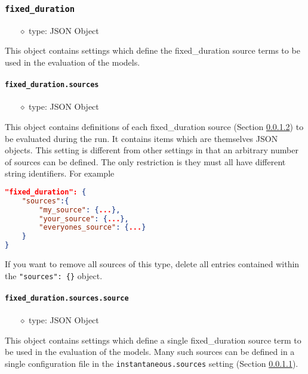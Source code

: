 \documentclass[]{article}
\def\code#1{\texttt{#1}}
\begin{document}
\subsubsection{\code{fixed\_duration}}
\begin{itemize}
    \item[$\diamond$] type: JSON Object 
\end{itemize}
This object contains settings which define the fixed\_duration source terms to be
used in the evaluation of the models.

\paragraph{\code{fixed\_duration.sources}}\label{sec:fixsources}
\begin{itemize}
    \item[$\diamond$] type: JSON Object 
\end{itemize}
This object contains definitions of each fixed\_duration source (Section
\ref{sec:fixsource}) to be evaluated during the run. It contains items which
are themselves JSON objects. This setting is different from other settings in
that an arbitrary number of sources can be defined. The only restriction is they
must all have different string identifiers. For example\\
\begin{lstlisting}[language=json,firstnumber=1]
"fixed_duration": {
    "sources":{
        "my_source": {...},
        "your_source": {...},
        "everyones_source": {...}
    }
}
\end{lstlisting}
\medskip

\noindent If you want to remove all sources of this type, delete all entries
contained within the \code{"sources": \{\}} object.

\paragraph{\code{fixed\_duration.sources.source}}\label{sec:fixsource}
\begin{itemize}
    \item[$\diamond$] type: JSON Object 
\end{itemize}
This object contains settings which define a single fixed\_duration source term to
be used in the evaluation of the models. Many such sources can be defined in a
single configuration file in the \code{instantaneous.sources} setting (Section
\ref{sec:fixsources}).
\end{document}
